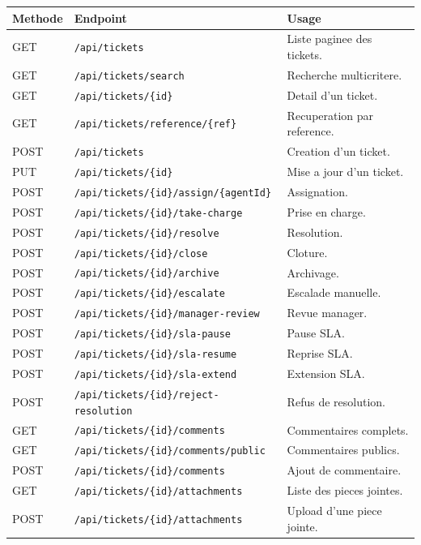 \documentclass[12pt,a4paper,oneside]{report}
\begin{document}
\begin{longtable}{>{\raggedright\arraybackslash}p{2.4cm} >{\raggedright\arraybackslash}p{4.8cm} >{\raggedright\arraybackslash}p{5.8cm}}
\toprule
Methode & Endpoint & Usage \\
\midrule
GET & \texttt{/api/tickets} & Liste paginee des tickets. \\
GET & \texttt{/api/tickets/search} & Recherche multicritere. \\
GET & \texttt{/api/tickets/\{id\}} & Detail d'un ticket. \\
GET & \texttt{/api/tickets/reference/\{ref\}} & Recuperation par reference. \\
POST & \texttt{/api/tickets} & Creation d'un ticket. \\
PUT & \texttt{/api/tickets/\{id\}} & Mise a jour d'un ticket. \\
POST & \texttt{/api/tickets/\{id\}/assign/\{agentId\}} & Assignation. \\
POST & \texttt{/api/tickets/\{id\}/take-charge} & Prise en charge. \\
POST & \texttt{/api/tickets/\{id\}/resolve} & Resolution. \\
POST & \texttt{/api/tickets/\{id\}/close} & Cloture. \\
POST & \texttt{/api/tickets/\{id\}/archive} & Archivage. \\
POST & \texttt{/api/tickets/\{id\}/escalate} & Escalade manuelle. \\
POST & \texttt{/api/tickets/\{id\}/manager-review} & Revue manager. \\
POST & \texttt{/api/tickets/\{id\}/sla-pause} & Pause SLA. \\
POST & \texttt{/api/tickets/\{id\}/sla-resume} & Reprise SLA. \\
POST & \texttt{/api/tickets/\{id\}/sla-extend} & Extension SLA. \\
POST & \texttt{/api/tickets/\{id\}/reject-resolution} & Refus de resolution. \\
GET & \texttt{/api/tickets/\{id\}/comments} & Commentaires complets. \\
GET & \texttt{/api/tickets/\{id\}/comments/public} & Commentaires publics. \\
POST & \texttt{/api/tickets/\{id\}/comments} & Ajout de commentaire. \\
GET & \texttt{/api/tickets/\{id\}/attachments} & Liste des pieces jointes. \\
POST & \texttt{/api/tickets/\{id\}/attachments} & Upload d'une piece jointe. \\

\end{longtable}
\end{document}
